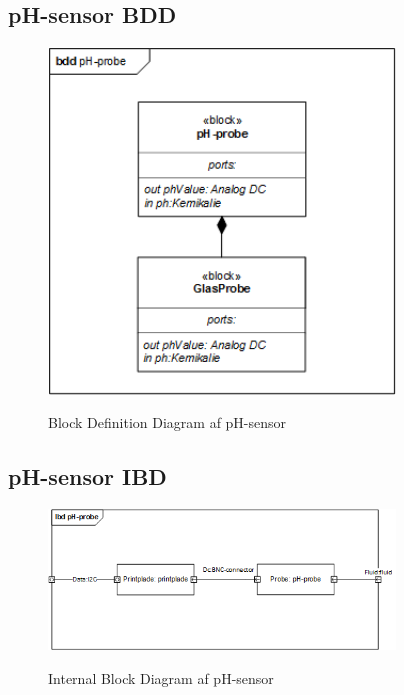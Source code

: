 
\subsection{pH-sensor BDD}

\begin{figure}[H]
	\centering
	\includegraphics[width=0.82\textwidth]{Systemarkitektur/Sensor_pH/pH_Probe_BDD.png}
	\label{fig:pH-sensor BDD}
	\caption{Block Definition Diagram af pH-sensor}
\end{figure}



\subsection{pH-sensor IBD}

\begin{figure}[H]
	\centering
	\includegraphics[width=0.82\textwidth]{Systemarkitektur/Sensor_pH/pH_Probe_IBD.png}
	\label{fig:pH-sensor IBD}
	\caption{Internal Block Diagram af pH-sensor}
\end{figure}


